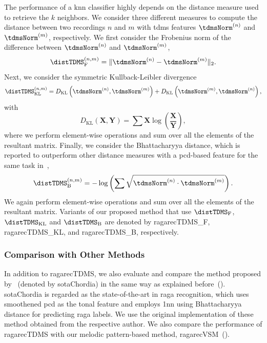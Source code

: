 The performance of a \gls{knn} classifier highly depends on the distance measure used to retrieve the $k$ neighbors. We consider three different measures to compute the distance between two recordings $n$ and $m$ with \gls{tdms} features $\tdmsNorm^{(n)}$ and $\tdmsNorm^{(m)}$, respectively. We first consider the Frobenius norm of the difference between $\tdmsNorm^{(n)}$ and $\tdmsNorm^{(m)}$,
\begin{equation}
\distTDMS_{\mathrm{F}}^{(n,m)} = \norm{\tdmsNorm^{(n)} - \tdmsNorm^{(m)}}_2 .
\end{equation}
Next, we consider the symmetric Kullback-Leibler divergence
\begin{equation}
\distTDMS_{\mathrm{KL}}^{(n,m)} = D_{\mathrm{KL}}\left(\tdmsNorm^{(n)},\tdmsNorm^{(m)}\right) + D_{\mathrm{KL}}\left(\tdmsNorm^{(m)},\tdmsNorm^{(n)}\right) ,
\end{equation}
with
\begin{equation}
D_{\mathrm{KL}}\left(\mathbf{X},\mathbf{Y}\right) = \sum{\mathbf{X} \log\left(\frac{\mathbf{X}}{\mathbf{Y}} \right)} ,
\end{equation}
where we perform element-wise operations and sum over all the elements of the resultant matrix. Finally, we consider the Bhattacharyya distance, which is reported to outperform other distance measures with a \gls{pcd}-based feature for the same task in~\cite{chordia2013joint},
\begin{equation}
\distTDMS_{\mathrm{B}}^{(n,m)} = -\log\left( \sum{ \sqrt{ \tdmsNorm^{(n)} \cdot \tdmsNorm^{(m)} } } \right) .
\end{equation}
We again perform element-wise operations and sum over all the elements of the resultant matrix. Variants of our proposed method that use $\distTDMS_{\mathrm{F}}$, $\distTDMS_{\mathrm{KL}}$ and $\distTDMS_{\mathrm{B}}$ are denoted by \acrshort{ragarecTDMS_F}, \acrshort{ragarecTDMS_KL}, and \acrshort{ragarecTDMS_B}, respectively.


\subsubsection{Comparison with Other Methods}
\label{sec:tdms_comparison_other}

In addition to \acrshort{ragarecTDMS}, we also evaluate and compare the method proposed by~\cite{chordia2013joint} (denoted by \acrshort{sotaChordia}) in the same way as explained before~(). \acrshort{sotaChordia} is regarded as the state-of-the-art in \gls{raga} recognition, which uses smoothened \acrfull{pcd} as the tonal feature and employs \acrfull{1nn} using Bhattacharyya distance for predicting \gls{raga} labels. We use the original implementation of these method obtained from the respective author. We also compare the performance of \acrshort{ragarecTDMS} with our melodic pattern-based method, \acrshort{ragarecVSM}~().



